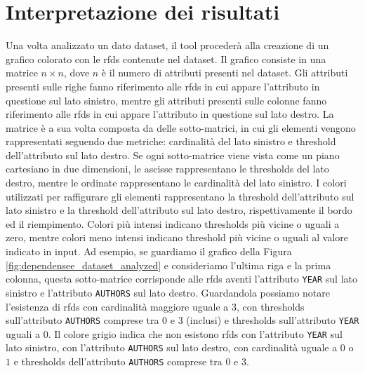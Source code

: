 \section{Interpretazione dei risultati}
Una volta analizzato un dato dataset, il tool proceder\`{a} alla creazione di un grafico colorato con le \acrlong{rfds} contenute nel dataset. Il grafico consiste in una matrice $n\times n$, dove $n$ \`{e} il numero di attributi presenti nel dataset. Gli attributi presenti sulle righe fanno riferimento alle \acrshort{rfds} in cui appare l'attributo in questione sul lato sinistro, mentre gli attributi presenti sulle colonne fanno riferimento alle \acrshort{rfds} in cui appare l'attributo in questione sul lato destro. La matrice \`{e} a sua volta composta da delle sotto-matrici, in cui gli elementi vengono rappresentati seguendo due metriche: cardinalit\`{a} del lato sinistro e threshold dell'attributo sul lato destro. Se ogni sotto-matrice viene vista come un piano cartesiano in due dimensioni, le ascisse rappresentano le thresholds del lato destro, mentre le ordinate rappresentano le cardinalit\`{a} del lato sinistro. I colori utilizzati per raffigurare gli elementi rappresentano la threshold dell'attributo sul lato sinistro e la threshold dell'attributo sul lato destro, rispettivamente il bordo ed il riempimento. Colori pi\`{u} intensi indicano thresholds pi\`{u} vicine o uguali a zero, mentre colori meno intensi indicano threshold pi\`{u} vicine o uguali al valore indicato in input. Ad esempio, se guardiamo il grafico della Figura \ref{fig:dependensee_dataset_analyzed} e consideriamo l'ultima riga e la prima colonna, questa sotto-matrice corrisponde alle \acrshort{rfds} aventi l'attributo \texttt{YEAR} sul lato sinistro e l'attributo \texttt{AUTHORS} sul lato destro. Guardandola possiamo notare l'esistenza di \acrshort{rfds} con cardinalit\`{a} maggiore uguale a $3$, con thresholds sull'attributo \texttt{AUTHORS} comprese tra $0$ e $3$ (inclusi) e thresholds sull'attributo \texttt{YEAR} uguali a $0$. Il colore grigio indica che non esistono \acrshort{rfds} con l'attributo \texttt{YEAR} sul lato sinistro, con l'attributo \texttt{AUTHORS} sul lato destro, con cardinalit\`{a} uguale a $0$ o $1$ e thresholds dell'attributo \texttt{AUTHORS} comprese tra $0$ e $3$.

